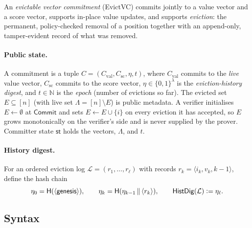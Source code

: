 \documentclass[version=submission]{iacrcc}
\theoremstyle{definition}
\newcommand{\secpar}{\lambda}
\newcommand{\bit}{\{0,1\}}
\newcommand{\defeq}{\vcentcolon=}
\newcommand{\concat}{\,\|\,}
\newcommand{\Commit}{\mathsf{Commit}}
\newcommand{\aux}{\mathsf{st}}
\newcommand{\HistDig}{\mathsf{HistDig}}
\newcommand{\Val}{\mathrm{val}}
\newcommand{\Sc}{\mathrm{sc}}
\newcommand{\Cval}{C_{\Val}}
\newcommand{\Csc}{C_{\Sc}}
\newcommand{\Live}{\Lambda}
\newcommand{\Evicted}{E}
\newcommand{\hash}{\mathsf{H}}
\newcommand{\Log}{\mathcal{L}}
\begin{document}
An \emph{evictable vector commitment} (EvictVC) commits jointly to a value
vector and a score vector, supports in-place value updates, and supports
\emph{eviction}: the permanent, policy-checked removal of a position together
with an append-only, tamper-evident record of what was removed.

\paragraph{Public state.}
A commitment is a tuple $C=(\Cval,\Csc,\eta,t)$, where $\Cval$ commits to the
\emph{live} value vector, $\Csc$ commits to the score vector,
$\eta\in\bit^{\secpar}$ is the \emph{eviction-history digest}, and
$t\in\mathbb{N}$ is the \emph{epoch} (number of evictions so far). The evicted
set $\Evicted\subseteq[n]$ (with live set $\Live=[n]\setminus\Evicted$) is public
metadata. A verifier initialises $\Evicted\leftarrow\emptyset$ at $\Commit$ and
sets $\Evicted\leftarrow\Evicted\cup\{i\}$ on every eviction it has accepted, so
$\Evicted$ grows monotonically on the verifier's side and is never supplied by
the prover. Committer state $\aux$ holds the vectors, $\Live$, and $t$.

\paragraph{History digest.}
For an ordered eviction log $\Log=(r_1,\dots,r_\ell)$ with records
$r_k=\langle i_k,v_k,k-1\rangle$, define the hash chain
\[
  \eta_0=\hash(\langle\textsf{genesis}\rangle),\qquad
  \eta_k=\hash(\eta_{k-1}\concat\langle r_k\rangle),\qquad
  \HistDig(\Log)\defeq\eta_\ell .
\]

\subsection{Syntax}
\end{document}
